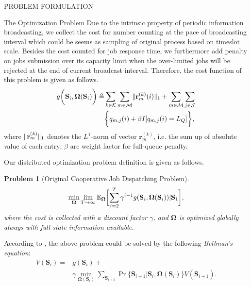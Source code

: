 \documentclass[10pt, conference, letterpaper]{IEEEtran}
\newtheorem{problem}{Problem}
\newcommand{\define}{\triangleq}
\renewcommand{\vec}{\mathbf}
\DeclarePairedDelimiter{\Inorm}{\|}{\|_1}
\DeclarePairedDelimiter{\Paren}{\bigg(}{\bigg)}
\DeclarePairedDelimiter{\Bracket}{\bigg[}{\bigg]}
\DeclarePairedDelimiter{\Brace}{\bigg\{}{\bigg\}}
\newcommand{\apSet}{\mathcal{K}}
\newcommand{\esSet}{\mathcal{M}}
\newcommand{\jSpace}{\mathcal{J}}
\newcommand{\Stat}{\mathbf{S}}
\newcommand{\Policy}{\boldsymbol{\Omega}}
\newcommand{\BPolicy}{\Policy} %
\begin{document}
\begin{section}{PROBLEM FORMULATION}
\begin{subsection}{The Optimization Problem}
            Due to the intrinsic property of periodic information broadcasting, we collect the cost for number counting at the pace of broadcasting interval which could be seems as sampling of original process based on timeslot scale.
            Besides the cost counted for job response time, we furthermore add penalty on jobs submission over its capacity limit when the over-limited jobs will be rejected at the end of current broadcast interval.
            Therefore, the cost function of this problem is given as follows.
            \begin{align}
                g\Paren{\Stat_{i}, \Policy(\Stat_{i})} \define& \sum_{k\in\apSet}\sum_{m\in\esSet} \Inorm{\vec{r}^{(k)}_{m}(i)} + \sum_{m\in\esSet}\sum_{j\in\jSpace}
                \nonumber\\
                &\Brace{
                    q_{m,j}(i) + \beta I[q_{m,j}(i)=L_Q]
                },
            \end{align}
            where $\Inorm{\vec{r}^{(k)}_{m}}$ denotes the $L^1$-norm of vector $\vec{r}^{(k)}_{m}$, i.e. the sum up of absolute value of each entry; $\beta$ are weight factor for full-queue penalty.
            
            Our distributed optimization problem definition is given as follows.
            \begin{problem}[Original Cooperative Job Dispatching Problem]
                \begin{gather}
                    \min_{\Policy} \lim_{T \to \infty}
                        \mathbb{E}_{\Policy}
                            \Bracket{\sum_{i=2}^{T} \gamma^{i-1} g(\Stat_{i}, \Policy(\Stat_{i}))|\Stat_1},
                \end{gather}
                where the cost is collected with a discount factor $\gamma$, and $\Policy$ is optimized globally always with full-state information available.
            \end{problem}
            According to \cite{sutton1998introduction}, the above problem could be solved by the following \emph{Bellman's equation}:
            \begin{align}
                V(\Stat_i) =& g(\Stat_i) +
                    \nonumber\\
                    &\gamma \min_{\Policy(\Stat_{i})} \sum_{\Stat_{i+1}} \Pr\{ \Stat_{i+1}|\Stat_{i}, \BPolicy(\Stat_{i}) \} V(\Stat_{i+1}).
                \label{sp0}
            \end{align}
            

\end{subsection}
\end{section}
\end{document}
